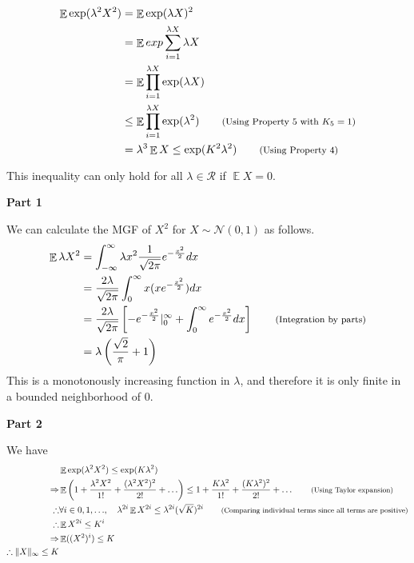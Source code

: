 \documentclass[11pt]{article}
\newenvironment{exercise}[2][Exercise]{\begin{trivlist}
\item[\hskip \labelsep {\bfseries #1}\hskip \labelsep {\bfseries #2.}]}{\end{trivlist}}
\newenvironment{solution}[1][Solution]{\begin{trivlist}
\item[\hskip \labelsep {\bfseries #1}\hskip \labelsep]}{\end{trivlist}}
\DeclareMathOperator*{\E}{\mathbb{E}}
\newcommand*{\annot}[1]{\tag*{\footnotesize{(#1)}}}
\begin{document}
\begin{exercise}{2.5.4}
\end{exercise}

\begin{solution}
\begin{align*}
\E \exp(\lambda^2 X^2) &= \E \exp (\lambda X)^2 \\
		&= \E exp \sum_{i=1}^{\lambda X}\lambda X \\
		&= \E \prod_{i=1}^{\lambda X}\exp(\lambda X) \\
		&\leq \E\prod_{i=1}^{\lambda X}\exp (\lambda^2) \annot{Using Property 5 with $K_5 = 1$}\\
		&= \lambda^3 \E X \leq \exp(K^2 \lambda^2) \annot{Using Property 4}\\
\end{align*}

This inequality can only hold for all $\lambda \in \mathcal{R}$ if $\E X = 0$.
\end{solution}


\begin{exercise}{2.5.5}
\end{exercise}

\begin{solution}

\textbf{Part 1}

We can calculate the MGF of $X^2$ for $X \sim \mathcal{N}(0,1)$ as follows.
\begin{align*}
\E \lambda X^2 &= \int_{-\infty}^{\infty}\lambda x^2 \frac{1}{\sqrt{2\pi}}e^{-\frac{x^2}{2}}dx \\
		&= \frac{2\lambda}{\sqrt{2\pi}}\int_{0}^{\infty}x(xe^{-\frac{x^2}{2}})dx \\
		&= \frac{2\lambda}{\sqrt{2\pi}}\left[ -e^{-\frac{x^2}{2}}|_0^{\infty} + \int_{0}^{\infty}e^{-\frac{x^2}{2}}dx \right] \annot{Integration by parts}\\
		&= \lambda\left( \frac{\sqrt{2}}{\pi} + 1 \right)\\
\end{align*}
This is a monotonously increasing function in $\lambda$, and therefore it is only finite in a bounded neighborhood of $0$.

\textbf{Part 2}

We have
\begin{align*}
& \E \exp(\lambda^2 X^2) \leq \exp(K \lambda^2) \\
\Rightarrow & \E \left( 1 + \frac{\lambda^2X^2}{1!} + \frac{(\lambda^2X^2)^2}{2!} + \ldots  \right) \leq 1 + \frac{K\lambda^2}{1!} + \frac{(K\lambda^2)^2}{2!} + \ldots \annot{Using Taylor expansion}\\
\therefore & \forall i \in {0,1,\ldots},~~~\lambda^{2i}\E X^{2i} \leq \lambda^{2i}(\sqrt{K})^{2i} \annot{Comparing individual terms since all terms are positive}\\
\therefore & \E X^{2i} \leq K^i \\  
\Rightarrow & \E ((X^2)^i)\leq K \\
\therefore \lVert X \rVert_{\infty} \leq K
\end{align*}
\end{solution}
\end{document}
